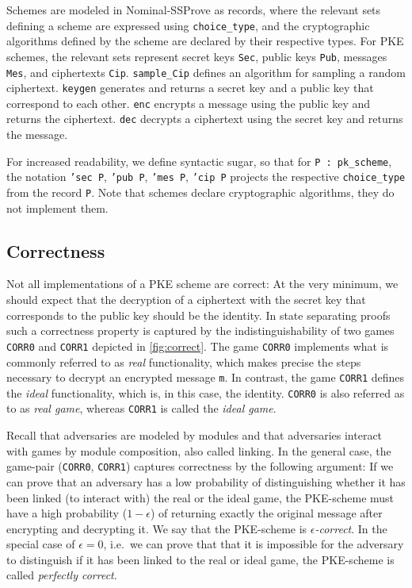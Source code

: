 \documentclass[a4paper,USenglish,cleveref, autoref]{lipics-v2021}
\newcommand{\M}[1]{\texttt{#1}}
\newcommand{\NSSP}{Nominal-SSProve\xspace}
\begin{document}
Schemes are modeled in \NSSP as records, where the relevant sets defining a scheme are expressed using \M{choice_type}, and the cryptographic algorithms defined by the scheme are declared by their respective types. 
For PKE schemes,  the relevant sets represent secret keys \M{Sec}, public keys \M{Pub}, messages \M{Mes}, and ciphertexts \M{Cip}. \M{sample_Cip} defines an algorithm for sampling a random ciphertext. \M{keygen} generates and returns
a secret key and a public key that correspond to each other. \M{enc}
encrypts a message using the public key and returns the ciphertext.
\M{dec} decrypts a ciphertext using the secret key and returns the message.

For increased readability, we define syntactic sugar, so that for \M{P : pk_scheme}, the notation \M{'sec P},
\M{'pub P}, \M{'mes P}, \M{'cip P} projects the respective \M{choice_type} from the record \M{P}. Note that schemes declare cryptographic algorithms, they do not implement them. 



\subsection{Correctness}\label{sec:correctness}

Not all implementations of a PKE scheme are correct: At the very minimum, we should expect that the decryption of a ciphertext with the secret key that corresponds to the public key should be the identity. In state separating proofs such a correctness property is captured by the indistinguishability of two games \M{CORR0} and \M{CORR1} depicted in \cref{fig:correct}.
The game \M{CORR0} implements what is commonly referred to as \emph{real} functionality, which makes precise the steps necessary to decrypt an encrypted  message \M{m}. In contrast, the game \M{CORR1} defines the \emph{ideal} functionality, which is, in this case, the identity.  \M{CORR0} is also referred as to as \emph{real game}, whereas \M{CORR1} is called the \emph{ideal game}. 
  
Recall that adversaries are modeled by modules and that adversaries interact with games by module composition, also called linking. In the general case, the game-pair (\M{CORR0}, \M{CORR1}) captures correctness by the following argument: 
If we can prove that an adversary has a low probability of
distinguishing whether it has been linked (to interact with) the real or the ideal game, the
PKE-scheme must have a high probability ($1-\epsilon$) of returning exactly the
original message after encrypting and decrypting it. We say that the PKE-scheme is \emph{$\epsilon$-correct}. In the special case of $\epsilon = 0$, i.e.\ we can prove that that it is impossible for the adversary to distinguish if it has been linked to the real or ideal game, the PKE-scheme is called \emph{perfectly correct}.
\end{document}
